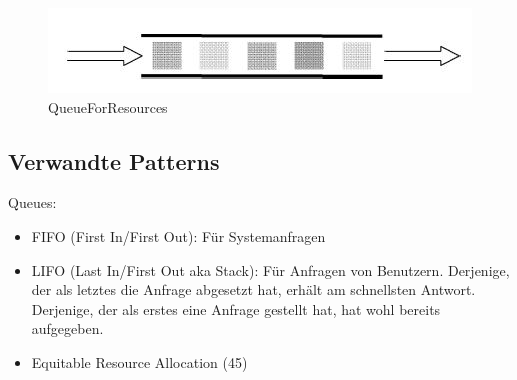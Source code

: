 \begin{figure}[H]
	\centering
	\includegraphics[width=\textwidth]{content/faulttolerance/images/QueueForResources.JPG}
	\caption{QueueForResources}
\end{figure}


\subsection{Verwandte Patterns}

Queues:
\begin{itemize}
	\item FIFO (First In/First Out): Für Systemanfragen
	\item LIFO (Last In/First Out aka Stack): Für Anfragen von Benutzern. Derjenige, der als letztes die Anfrage abgesetzt hat, erhält am schnellsten Antwort. Derjenige, der als erstes eine Anfrage gestellt hat, hat wohl bereits aufgegeben.
\end{itemize}

\begin{itemize}
	\item Equitable Resource Allocation (45)
\end{itemize}


